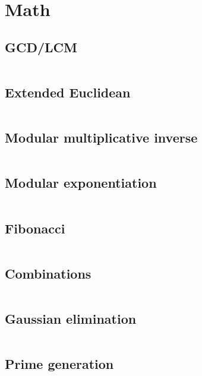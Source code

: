 \section{Math}
\subsection{GCD/LCM}
\inputminted[frame=single,framesep=3pt,tabsize=2,breaklines=true,linenos,label=O(log(K))]{c++}{math/gcd.cpp}

\subsection{Extended Euclidean}
\inputminted[frame=single,framesep=3pt,tabsize=2,breaklines=true,linenos,label=O(log(K))]{c++}{math/extgcd.cpp}

\subsection{Modular multiplicative inverse}
\inputminted[frame=single,framesep=3pt,tabsize=2,breaklines=true,linenos,label=O(log(K))]{c++}{math/mod-mult-inverse.cpp}

\subsection{Modular exponentiation}
\inputminted[frame=single,framesep=3pt,tabsize=2,breaklines=true,linenos,label=O(log(K))]{c++}{math/expmod.cpp}

\subsection{Fibonacci}
\inputminted[frame=single,framesep=3pt,tabsize=2,breaklines=true,linenos,label=O(N)]{c++}{math/fib.cpp}

\subsection{Combinations}
\inputminted[frame=single,framesep=3pt,tabsize=2,breaklines=true,linenos,label=O($N^2$)]{c++}{math/combinations.cpp}

\subsection{Gaussian elimination}
\inputminted[frame=single,framesep=3pt,breaklines=true,tabsize=2,linenos,label=O($N^3$)]{c++}{math/gaussian-elimination.cpp}

\subsection{Prime generation}
\inputminted[frame=single,framesep=3pt,tabsize=2,breaklines=true,linenos,label=O(N log(log(N)))]{c++}{math/prime-gen.cpp}

